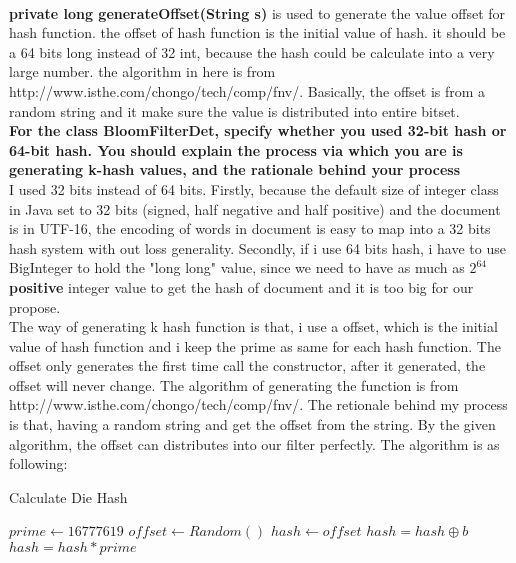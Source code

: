 \documentclass[a4paper,14pt]{article}
\begin{document}
\\[6pt]
\textbf{private long generateOffset(String s)} is used to generate the value offset for hash function. the offset of hash function is the initial value of hash. it should be a 64 bits long instead of 32 int, because the hash could be calculate into a very large number. the algorithm in here is from http://www.isthe.com/chongo/tech/comp/fnv/. Basically, the offset is from a random string and it make sure the value is distributed into entire bitset.
\\[6pt]
\textbf{For the class BloomFilterDet, specify whether you used 32-bit hash or 64-bit hash. You should explain the process via which you are is generating k-hash values, and the rationale behind your process}
\\[6pt]
I used 32 bits instead of 64 bits. Firstly, because the default size of integer class in Java set to 32 bits (signed, half negative and half positive) and the document is in UTF-16, the encoding of words in document is easy to map into a 32 bits hash system with out loss generality. Secondly, if i use 64 bits hash, i have to use BigInteger to hold the "long long" value, since we need to have as much as $ 2^{64} $ \textbf{positive} integer value to get the hash of document and it is too big for our propose. 
\\[6pt]
The way of generating k hash function is that, i use a offset, which is the initial value of hash function and i keep the prime as same for each hash function. The offset only generates the first time call the constructor, after it generated, the offset will never change. The algorithm of generating the function is from http://www.isthe.com/chongo/tech/comp/fnv/. The retionale behind my process is that, having a random string and get the offset from the string. By the given algorithm, the offset can distributes into our filter perfectly. The algorithm is as following:
\begin{algorithm}
\caption{Calculate Die Hash}
\begin{algorithmic}
\STATE $prime \gets16777619$
\STATE $offset \gets Random()$
\STATE $hash \gets offset$
\STATE $hash = hash \oplus b$
\STATE $hash = hash* prime$
\ENDFOR
\end{algorithmic}
\end{algorithm} 
\end{document}
